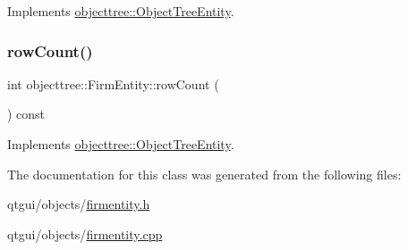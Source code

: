 Implements \mbox{\hyperlink{classobjecttree_1_1_object_tree_entity_a2d1b13c056476f87637aacd7e99e7305}{objecttree\+::\+Object\+Tree\+Entity}}.

\mbox{\label{classobjecttree_1_1_firm_entity_a54710c1de98b77d104881459adfb5e3a}} 
\subsubsection{\texorpdfstring{rowCount()}{rowCount()}}
{\footnotesize\ttfamily int objecttree\+::\+Firm\+Entity\+::row\+Count (\begin{DoxyParamCaption}{ }\end{DoxyParamCaption}) const\hspace{0.3cm}{\ttfamily [virtual]}}



Implements \mbox{\hyperlink{classobjecttree_1_1_object_tree_entity_a82c626bb28c55dcfce11cf7ec3368588}{objecttree\+::\+Object\+Tree\+Entity}}.



The documentation for this class was generated from the following files\+:\begin{DoxyCompactItemize}
\item 
qtgui/objects/\mbox{\hyperlink{firmentity_8h}{firmentity.\+h}}\item 
qtgui/objects/\mbox{\hyperlink{firmentity_8cpp}{firmentity.\+cpp}}\end{DoxyCompactItemize}

